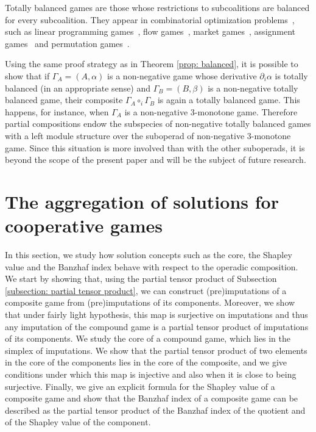 \documentclass[a4paper,12pt]{amsart}
\begin{document}
\begin{remark}\label{rmk: totally balanced games}
Totally balanced games are those whose restrictions to subcoalitions are balanced for every subcoalition. They appear in combinatorial optimization problems~\cite{curiel1988cooperative}, such as linear programming games~\cite{debreu1963limit, owen1975core}, flow games~\cite{kalai1982totally}, market games~\cite{shapley1969market}, assignment games~\cite{gale1962college, shapley1971assignment} and permutation games~\cite{shapley1974cores}. 

\medskip

Using the same proof strategy as in Theorem \ref{prop: balanced}, it is possible to show that if $\Gamma_A = (A, \alpha)$ is a non-negative game whose derivative $\partial_i \alpha$ is totally balanced (in an appropriate sense) and $\Gamma_B = (B,\beta)$ is a non-negative totally balanced game, their composite $\Gamma_A \circ_i \Gamma_B$ is again a totally balanced game. This happens, for instance, when $\Gamma_A$ is a non-negative $3$-monotone game. Therefore partial compositions endow the subspecies of non-negative totally balanced games with a left module structure over the suboperad of non-negative $3$-monotone game. Since this situation is more involved than with the other suboperads, it is beyond the scope of the present paper and will be the subject of future research. 
\end{remark}

\vspace{1.5pc}

\section{The aggregation of solutions for cooperative games}\label{Section: aggregation of solutions}

\vspace{2pc}

In this section, we study how solution concepts such as the core, the Shapley value and the Banzhaf index behave with respect to the operadic composition. We start by showing that, using the partial tensor product of Subsection \ref{subsection: partial tensor product}, we can construct (pre)imputations of a composite game from (pre)imputations of its components. Moreover, we show that under fairly light hypothesis, this map is surjective on imputations and thus any imputation of the compound game is a partial tensor product of imputations of its components. We study the core of a compound game, which lies in the simplex of imputations. We show that the partial tensor product of two elements in the core of the components lies in the core of the composite, and we give conditions under which this map is injective and also when it is close to being surjective. Finally, we give an explicit formula for the Shapley value of a composite game and show that the Banzhaf index of a composite game can be described as the partial tensor product of the Banzhaf index of the quotient and of the Shapley value of the component. 
\end{document}

